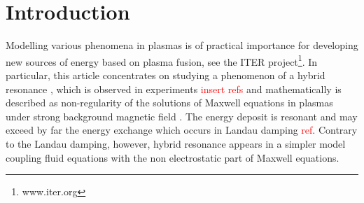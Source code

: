 \section{Introduction}
Modelling various phenomena in plasmas is of practical importance for developing new sources of energy 
based on plasma fusion, see the ITER project\footnote{www.iter.org}. 
In particular, this article concentrates on studying a phenomenon of a hybrid resonance \cite{Stix}, 
which is observed in experiments  \textcolor{red}{insert refs}\cite{} and 
mathematically is described as non-regularity of
the solutions of Maxwell equations in plasmas under strong background magnetic field \cite{Despres_2014}. 
The energy deposit is resonant and may exceed by far the energy 
exchange which occurs in Landau damping \textcolor{red}{ref}. 
Contrary to the Landau damping, however, 
hybrid resonance appears in a simpler model coupling 
fluid equations with the non electrostatic part of Maxwell equations.


